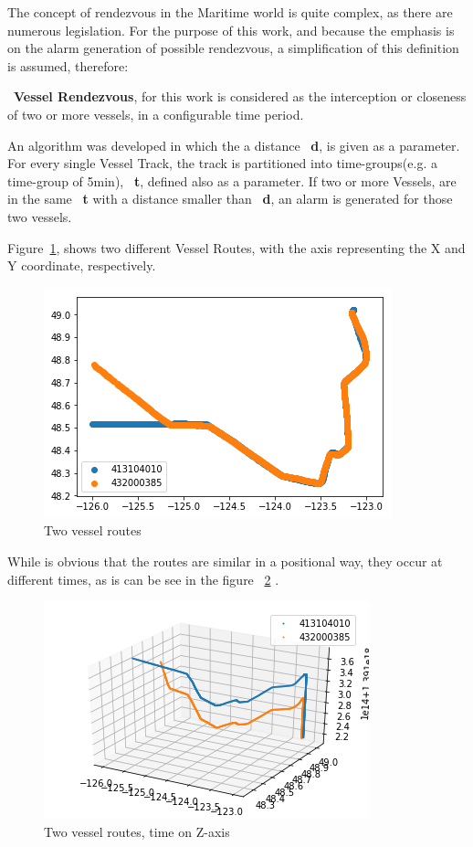 The concept of rendezvous in the Maritime world is quite complex, as there are numerous legislation. For the purpose of this work, and because the emphasis is on the alarm generation of possible rendezvous, a simplification of this definition is assumed, therefore: 

~\textbf{Vessel Rendezvous}, for this work is considered as the interception or closeness of two or more vessels, in a configurable time period.

An algorithm was developed in which the a distance ~\textbf{d}, is given as a parameter. For every single Vessel Track, the track is partitioned into time-groups(e.g. a time-group of 5min), ~\textbf{t}, defined also as a parameter. If two or more Vessels, are in the same ~\textbf{t} with a distance smaller than ~\textbf{d}, an alarm is generated for those two vessels.

Figure~\ref{fig: VesselRendevouz2d}, shows two different Vessel Routes, with the axis representing the X and Y coordinate, respectively.

\begin{figure}[H]
	\centering
	\includegraphics[scale = .8]{figures/VesselRendevouz2d}
    \caption{Two vessel routes}
    \label{fig: VesselRendevouz2d}
\end{figure}

While is obvious that the routes are similar in a positional way, they occur at different times, as is can be see in the figure ~\ref{fig: VesselRendevouz3d} .

\begin{figure}[H]
	\centering
	\includegraphics[scale = .9]{figures/VesselRendevouz3d}
    \caption{Two vessel routes, time on Z-axis}
    \label{fig: VesselRendevouz3d}
\end{figure}


